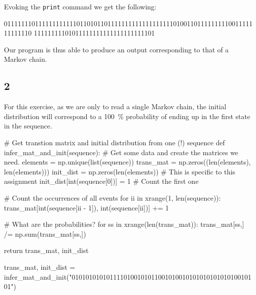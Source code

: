 \documentclass[10pt]{article}\usepackage[]{graphicx}\usepackage[]{color}
\theoremstyle{plain}
\begin{document}
Evoking the \texttt{print} command we get the following:
\begin{Schunk}
\begin{Soutput}
01111111011111111111101101011011111111111111111110100110111111111001111111111110
11111111101011111111111111111111101
\end{Soutput}
\end{Schunk}

Our program is thus able to produce an output corresponding to that of a Markov chain.

\subsection*{2}
For this exercise, as we are only to read a single Markov chain, the initial distribution will correspond to a 100~\% probability of ending up in the first state in the sequence. 
\begin{Schunk}
\begin{Sinput}
# Get transtion matrix and initial distribution from one (!) sequence
def infer_mat_and_init(sequence):
    # Get some data and create the matrices we need.
    elements = np.unique(list(sequence))
    trans_mat = np.zeros((len(elements), len(elements)))
    init_dist = np.zeros(len(elements)) # This is specific to this assignment
    init_dist[int(sequence[0])] = 1  # Count the first one

    # Count the occurrences of all events
    for ii in xrange(1, len(sequence)):
        trans_mat[int(sequence[ii - 1]), int(sequence[ii])] += 1

    # What are the probabilities?
    for ss in xrange(len(trans_mat)):
       trans_mat[ss,] /= np.sum(trans_mat[ss,])

    return trans_mat, init_dist


trans_mat, init_dist = infer_mat_and_init("010101010101111010010101100101001010101010101010010101")
\end{Sinput}
\end{Schunk}
\end{document}
